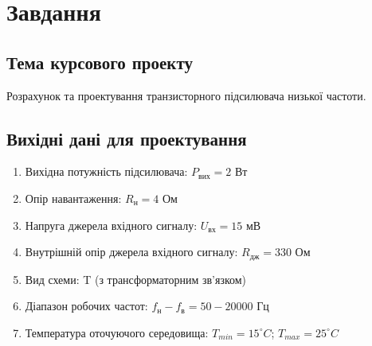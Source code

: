\documentclass[main.tex]{subfiles}
\begin{document}
\section{Завдання}

\subsection{Тема курсового проекту}
Розрахунок та проектування транзисторного підсилювача низької частоти.

\subsection{Вихідні дані для проектування}
\begin{enumerate}
    \item Вихідна потужність підсилювача: $P_\text{вих} = 2$ Вт
    \item Опір навантаження: $R_\text{н} = 4$ Ом
    \item Напруга джерела вхідного сигналу: $U_\text{вх} = 15$ мВ
    \item Внутрішній опір джерела вхідного сигналу: $R_{\text{дж}} = 330$ Ом
    \item Вид схеми: T (з трансформаторним зв'язком)
    \item Діапазон робочих частот: $f_{\text{н}} - f_{\text{в}} = 50 - 20000$ Гц
    \item Температура оточуючого середовища: $T_{min} = 15^\circ C$; $T_{max} = 25^\circ C$
\end{enumerate}
\end{document}
